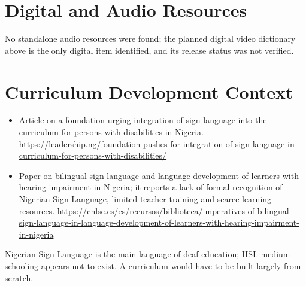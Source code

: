 \documentclass[12pt]{article}
\begin{document}
\section{Digital and Audio Resources}
No standalone audio resources were found; the planned digital video dictionary above is the only digital item identified, and its release status was not verified.

\section{Curriculum Development Context}
\begin{itemize}
\item Article on a foundation urging integration of sign language into the curriculum for persons with disabilities in Nigeria. \url{https://leadership.ng/foundation-pushes-for-integration-of-sign-language-in-curriculum-for-persons-with-disabilities/}
\item Paper on bilingual sign language and language development of learners with hearing impairment in Nigeria; it reports a lack of formal recognition of Nigerian Sign Language, limited teacher training and scarce learning resources. \url{https://cnlse.es/es/recursos/biblioteca/imperatives-of-bilingual-sign-language-in-language-development-of-learners-with-hearing-impairment-in-nigeria}
\end{itemize}
Nigerian Sign Language is the main language of deaf education; HSL-medium schooling appears not to exist. A curriculum would have to be built largely from scratch.
\end{document}
